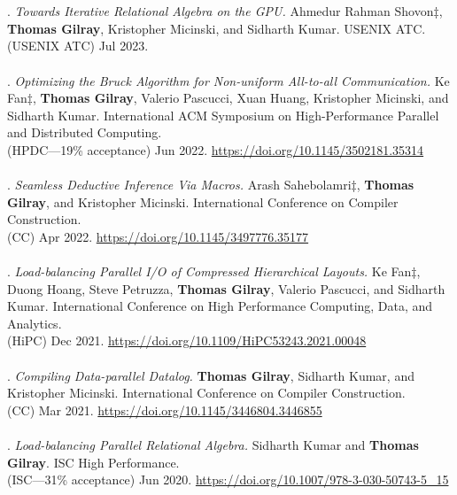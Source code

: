 \\ \vspace{-0.1cm}\\
\paper. \textit{Towards Iterative Relational Algebra on the GPU.}
Ahmedur Rahman Shovon$\ddagger$, \textbf{Thomas Gilray}, Kristopher Micinski, and Sidharth Kumar.
USENIX ATC.
\\(USENIX ATC) Jul 2023.
\\ \vspace{-0.1cm}\\
\paper. \textit{Optimizing the Bruck Algorithm for Non-uniform All-to-all Communication.}
Ke Fan$\ddagger$, \textbf{Thomas Gilray}, Valerio Pascucci, Xuan Huang, Kristopher Micinski, and Sidharth Kumar.
International ACM Symposium on High-Performance Parallel and Distributed Computing.
\\(HPDC---19\% acceptance) Jun 2022. \url{https://doi.org/10.1145/3502181.35314}
\\ \vspace{-0.1cm}\\
\paper. \textit{Seamless Deductive Inference Via Macros.}
Arash Sahebolamri$\ddagger$, \textbf{Thomas Gilray}, and Kristopher Micinski.
International Conference on Compiler Construction.
\\(CC) Apr 2022. \url{https://doi.org/10.1145/3497776.35177}
\\ \vspace{-0.1cm}\\
\paper. \textit{Load-balancing Parallel I/O of Compressed Hierarchical Layouts.}
Ke Fan$\ddagger$, Duong Hoang, Steve Petruzza, \textbf{Thomas Gilray}, Valerio Pascucci, and Sidharth Kumar.
International Conference on High Performance Computing, Data, and Analytics.
\\(HiPC) Dec 2021. \url{https://doi.org/10.1109/HiPC53243.2021.00048}
\\ \vspace{-0.1cm}\\
\paper. \textit{Compiling Data-parallel Datalog.}
\textbf{Thomas Gilray}, Sidharth Kumar, and Kristopher Micinski.
International Conference on Compiler Construction.
\\(CC) Mar 2021. \url{https://doi.org/10.1145/3446804.3446855}
\\ \vspace{-0.1cm}\\
\paper. \textit{Load-balancing Parallel Relational Algebra.}
Sidharth Kumar and \textbf{Thomas Gilray}.
ISC High Performance.
\\(ISC---31\% acceptance) Jun 2020. \url{https://doi.org/10.1007/978-3-030-50743-5_15}
